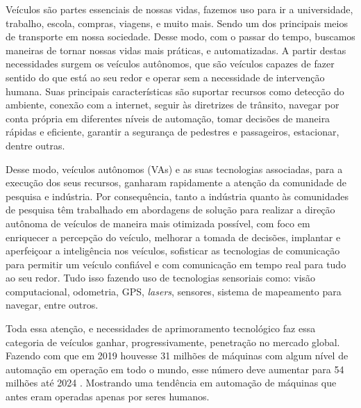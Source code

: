 \documentclass[
	12pt,				%
	openany, %
	a4paper,			%
	english,			%
	french,				%
	spanish,			%
	brazil				%
	]{abntex2}
\begin{document}
Veículos são partes essenciais de nossas vidas, fazemos uso para ir a universidade, trabalho, escola, compras, viagens, e muito mais. Sendo um dos principais meios de transporte em nossa sociedade.
Desse modo, com o passar do tempo, buscamos maneiras de tornar nossas vidas mais práticas, e automatizadas. A partir destas necessidades surgem os veículos autônomos, que são veículos capazes de fazer sentido do que está ao seu redor e operar sem a necessidade de intervenção humana. Suas principais características são suportar recursos como detecção do ambiente, conexão com a internet, seguir às diretrizes de trânsito, navegar por conta própria em diferentes níveis de automação, tomar decisões de maneira rápidas e eficiente, garantir a segurança de pedestres e passageiros, estacionar, dentre outras.

Desse modo, veículos autônomos (VAs) e as suas tecnologias associadas, para a execução dos seus recursos, ganharam rapidamente a atenção da comunidade de pesquisa e indústria. Por consequência, tanto a indústria quanto às comunidades de pesquisa têm trabalhado em abordagens de solução para realizar a direção autônoma de veículos de maneira mais otimizada possível, com foco em enriquecer a percepção do veículo, melhorar a tomada de decisões, implantar e aperfeiçoar a inteligência nos veículos, sofisticar as tecnologias de comunicação para permitir um veículo confiável e com comunicação em tempo real para tudo ao seu redor. Tudo isso fazendo uso de tecnologias sensoriais como: visão computacional, odometria, GPS, \textit{lasers}, sensores, sistema de mapeamento para navegar, entre outros.

Toda essa atenção, e necessidades de aprimoramento tecnológico faz essa categoria de veículos ganhar, progressivamente, penetração no mercado global. Fazendo com que em 2019 houvesse 31 milhões de máquinas com algum nível de automação em operação em todo o mundo, esse número deve aumentar para 54 milhões até 2024 \cite{sensors}. Mostrando uma tendência em automação de máquinas que antes eram operadas apenas por seres humanos.
\end{document}
